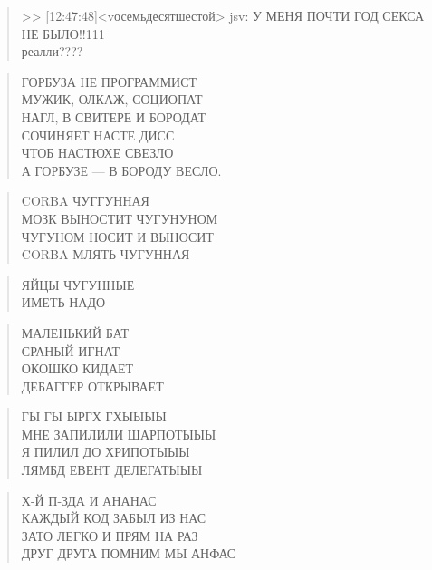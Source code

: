 \poemtitle{***}
\begin{verse}
>> [12:47:48]<vосемьдесятшестой> jsv: У МЕНЯ ПОЧТИ ГОД СЕКСА НЕ БЫЛО!!111\\
реалли????
\end{verse}

\poemtitle{***}
\begin{verse}
ГОРБУЗА НЕ ПРОГРАММИСТ\\
МУЖИК, ОЛКАЖ, СОЦИОПАТ\\
НАГЛ,  В СВИТЕРЕ И БОРОДАТ\\
СОЧИНЯЕТ НАСТЕ ДИСС\\
ЧТОБ НАСТЮХЕ СВЕЗЛО\\
А ГОРБУЗЕ — В БОРОДУ ВЕСЛО.
\end{verse}

\poemtitle{***}
\begin{verse}
CORBA ЧУГГУННАЯ\\
МОЗК ВЫНОСТИТ ЧУГУНУНОМ\\
ЧУГУНОМ НОСИТ И ВЫНОСИТ\\
CORBA МЛЯТЬ ЧУГУННАЯ
\end{verse}

\poemtitle{***}
\begin{verse}
ЯЙЦЫ ЧУГУННЫЕ\\
ИМЕТЬ НАДО
\end{verse}

\poemtitle{***}
\begin{verse}
МАЛЕНЬКИЙ БАТ\\
СРАНЫЙ ИГНАТ\\
ОКОШКО КИДАЕТ\\
ДЕБАГГЕР ОТКРЫВАЕТ
\end{verse}

\poemtitle{***}
\begin{verse}
ГЫ ГЫ ЫРГХ ГХЫЫЫЫ\\
МНЕ ЗАПИЛИЛИ ШАРПОТЫЫЫ\\
Я ПИЛИЛ ДО ХРИПОТЫЫЫ\\
ЛЯМБД ЕВЕНТ ДЕЛЕГАТЫЫЫ
\end{verse}

\poemtitle{***}
\begin{verse}
Х-Й П-ЗДА И АНАНАС\\
КАЖДЫЙ КОД ЗАБЫЛ ИЗ НАС\\
ЗАТО ЛЕГКО И ПРЯМ НА РАЗ\\
ДРУГ ДРУГА ПОМНИМ МЫ АНФАС
\end{verse}

